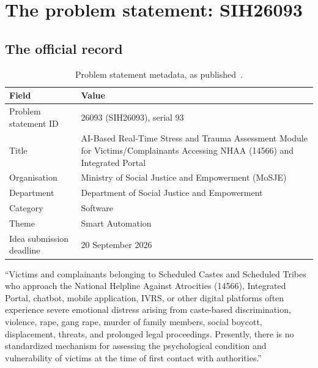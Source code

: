 \documentclass[11pt,a4paper]{article}
\newcommand{\codeus}{\textunderscore\allowbreak}
\DeclareRobustCommand{\code}[1]{{\ttfamily\let\_\codeus #1}}
\begin{document}
\section{The problem statement: SIH26093}
\label{sec:ps}

\subsection{The official record}
\begin{table}[!htbp]
\centering\small
\caption{Problem statement metadata, as published~\cite{sih26093}.}
\label{tab:psmeta}
\begin{tabularx}{\linewidth}{@{}>{\raggedright\arraybackslash}p{3.4cm}X@{}}
\toprule
Field & Value \\
\midrule
Problem statement ID & 26093 (\code{SIH26093}), serial 93 \\
Title & AI-Based Real-Time Stress and Trauma Assessment Module for Victims/Complainants Accessing NHAA (14566) and Integrated Portal \\
Organisation & Ministry of Social Justice and Empowerment (MoSJE) \\
Department & Department of Social Justice and Empowerment \\
Category & Software \\
Theme & Smart Automation \\
Idea submission deadline & 20 September 2026 \\
\bottomrule
\end{tabularx}
\end{table}

\begin{quotebox}[title={Background, as issued}]
\small
``Victims and complainants belonging to Scheduled Castes and Scheduled Tribes who approach the
National Helpline Against Atrocities (14566), Integrated Portal, chatbot, mobile application, IVRS,
or other digital platforms often experience severe emotional distress arising from caste-based
discrimination, violence, rape, gang rape, murder of family members, social boycott, displacement,
threats, and prolonged legal proceedings. Presently, there is no standardized mechanism for
assessing the psychological condition and vulnerability of victims at the time of first contact with
authorities.''
\end{quotebox}
\end{document}
